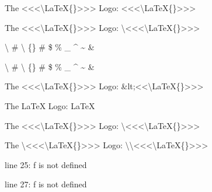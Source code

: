 
The <<<\textbackslash{}LaTeX\{\}>>> Logo: {\mktsStyleCode{}<<<\textbackslash{}LaTeX\{\}>>>}\mktsShowpar\par
The <<<\textbackslash{}LaTeX\{\}>>> Logo: {\mktsStyleCode{}\textbackslash{}<<<\textbackslash{}LaTeX\{\}>>>}\mktsShowpar\par
\textbackslash{} \# \textbackslash{} \{\} \# \$ \% \_ \textasciicircum{} \textasciitilde{} \&\mktsShowpar\par
{\mktsStyleCode{}\textbackslash{} \# \textbackslash{} \{\} \# \$ \% \_ \textasciicircum{} \textasciitilde{} \&}\mktsShowpar\par
The <<<\textbackslash{}LaTeX\{\}>>> Logo: {\mktsStyleCode{}\&lt;<<\textbackslash{}LaTeX\{\}>>>}\mktsShowpar\par
The \LaTeX{} Logo: {\mktsStyleCode{}\LaTeX{}}\mktsShowpar\par
The <<<\textbackslash{}LaTeX\{\}>>> Logo: {\mktsStyleCode{}\textbackslash{}<<<\textbackslash{}LaTeX\{\}>>>}\mktsShowpar\par
The \textbackslash{}<<<\textbackslash{}LaTeX\{\}>>> Logo: {\mktsStyleCode{}\textbackslash{}\textbackslash{}<<<\textbackslash{}LaTeX\{\}>>>}\mktsShowpar\par
\mktsShowpar\par
\begin{mktsEnvWarning}line 25: f is not defined\end{mktsEnvWarning}\mktsShowpar\par
\begin{mktsEnvWarning}line 27: f is not defined\end{mktsEnvWarning}\mktsShowpar\par

